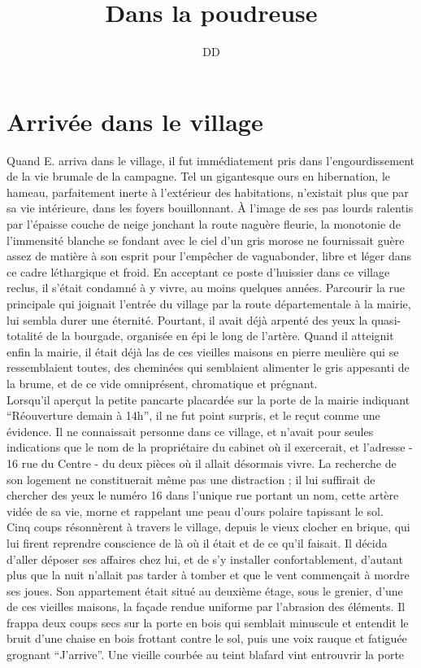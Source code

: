 \documentclass[french,amstex,12pt,a5paper]{book}
\begin{document}
\title{Dans la poudreuse}
\author{DD}
\maketitle

\tableofcontents

\chapter{Arrivée dans le village}

Quand E. arriva dans le village, il fut immédiatement pris dans l'engourdissement de la vie brumale de la campagne. Tel un gigantesque ours en hibernation, le hameau, parfaitement inerte à l'extérieur des habitations, n'existait plus que par sa vie intérieure, dans les foyers bouillonnant. À l'image de ses pas lourds ralentis par l'épaisse couche de neige jonchant la route naguère fleurie, la monotonie de l'immensité blanche se fondant avec le ciel d'un gris morose ne fournissait guère assez de matière à son esprit pour l'empêcher de vaguabonder, libre et léger dans ce cadre léthargique et froid. En acceptant ce poste d'huissier dans ce village reclus, il s'était condamné à y vivre, au moins quelques années. Parcourir la rue principale qui joignait l'entrée du village par la route départementale à la mairie, lui sembla durer une éternité. Pourtant, il avait déjà arpenté des yeux la quasi-totalité de la bourgade, organisée en épi le long de l'artère. Quand il atteignit enfin la mairie, il était déjà las de ces vieilles maisons en pierre meulière qui se ressemblaient toutes, des cheminées qui semblaient alimenter le gris appesanti de la brume, et de ce vide omniprésent, chromatique et prégnant.\\

Lorsqu'il aperçut la petite pancarte placardée sur la porte de la mairie indiquant ``Réouverture demain à 14h'', il ne fut point surpris, et le reçut comme une évidence. Il ne connaissait personne dans ce village, et n'avait pour seules indications que le nom de la propriétaire du cabinet où il exercerait, et l'adresse - 16 rue du Centre - du deux pièces où il allait désormais vivre. La recherche de son logement ne constituerait même pas une distraction ; il lui suffirait de chercher des yeux le numéro 16 dans l'unique rue portant un nom, cette artère vidée de sa vie, morne et rappelant une peau d'ours polaire tapissant le sol.\\

Cinq coups résonnèrent à travers le village, depuis le vieux clocher en brique, qui lui firent reprendre conscience de là où il était et de ce qu'il faisait. Il décida d'aller déposer ses affaires chez lui, et de s'y installer confortablement, d'autant plus que la nuit n'allait pas tarder à tomber et que le vent commençait à mordre ses joues. Son appartement était situé au deuxième étage, sous le grenier, d'une de ces vieilles maisons, la façade rendue uniforme par l'abrasion des éléments. Il frappa deux coups secs sur la porte en bois qui semblait minuscule et entendit le bruit d'une chaise en bois frottant contre le sol, puis une voix rauque et fatiguée grognant ``J'arrive''. Une vieille courbée au teint blafard vint entrouvrir la porte
\end{document}
